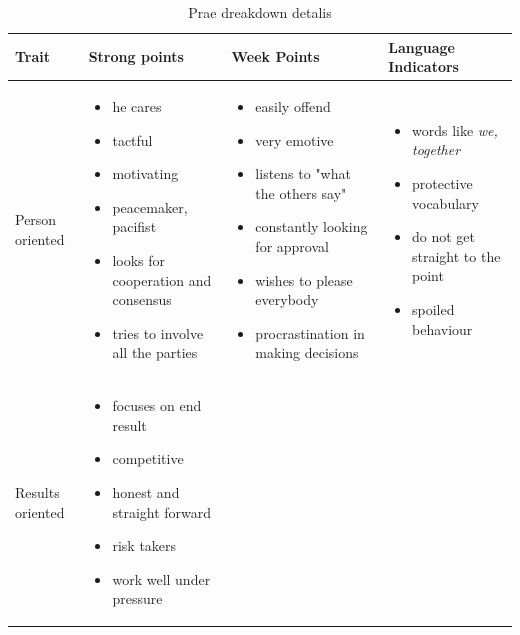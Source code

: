 \begin{table}[h]
  \centering
  \caption{Prae dreakdown detalis}
  \setlength\tabcolsep{3.8pt}
  \setlength\extrarowheight{1pt}
    \begin{tabular}{ | p{} | p{} | p{} | p{} |}
    \hline
    Trait & Strong points & Week Points & Language Indicators \\ \hline
    
    Person oriented 
     &
      \begin{itemize}
      \item he cares
      \item tactful
      \item motivating
      \item peacemaker, pacifist
      \item looks for cooperation and consensus
      \item tries to involve all the parties
      \end{itemize}
     & 
      \begin{itemize}
      \item easily offend
      \item very emotive
      \item listens to "what the others say"
      \item constantly looking for approval
      \item wishes to please everybody
      \item procrastination in making decisions
      \end{itemize}
     & 
      \begin{itemize}
      \item words like \textit{we, together}
      \item protective vocabulary
      \item do not get straight to the point
      \item spoiled behaviour
      \end{itemize}
     \\ \hline
    Results oriented
     &
      \begin{itemize}
       \item focuses on end result
       \item competitive
       \item honest and straight forward
       \item risk takers
       \item work well under pressure

\end{itemize}
\end{tabular}
\end{table}

